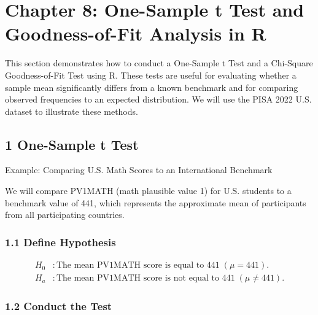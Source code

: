 \documentclass[
  letterpaper,
  DIV=11,
  numbers=noendperiod]{scrreprt}
\begin{document}

\chapter*{Chapter 8: One-Sample t Test and Goodness-of-Fit Analysis in
R}\label{chapter-8-one-sample-t-test-and-goodness-of-fit-analysis-in-r}


This section demonstrates how to conduct a One-Sample t Test and a
Chi-Square Goodness-of-Fit Test using R. These tests are useful for
evaluating whether a sample mean significantly differs from a known
benchmark and for comparing observed frequencies to an expected
distribution. We will use the PISA 2022 U.S. dataset to illustrate these
methods.

\section*{1 One-Sample t Test}\label{one-sample-t-test}


Example: Comparing U.S. Math Scores to an International Benchmark

We will compare PV1MATH (math plausible value 1) for U.S. students to a
benchmark value of 441, which represents the approximate mean of
participants from all participating countries.

\subsection*{1.1 Define Hypothesis}\label{define-hypothesis}

\[
\begin{aligned}
H_0 &: \text{The mean PV1MATH score is equal to } 441 \; (\mu = 441). \\
H_a &: \text{The mean PV1MATH score is not equal to } 441 \; (\mu \ne 441).
\end{aligned}
\]

\subsection*{1.2 Conduct the Test}\label{conduct-the-test}
\end{document}
